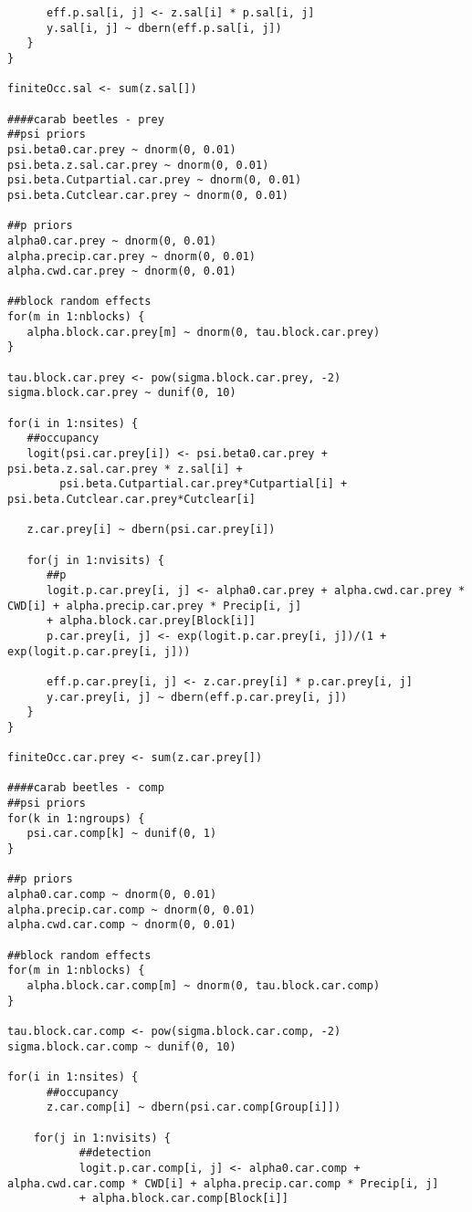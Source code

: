 \begin{lstlisting}
      eff.p.sal[i, j] <- z.sal[i] * p.sal[i, j]
      y.sal[i, j] ~ dbern(eff.p.sal[i, j])
   }
}

finiteOcc.sal <- sum(z.sal[])

####carab beetles - prey
##psi priors
psi.beta0.car.prey ~ dnorm(0, 0.01)
psi.beta.z.sal.car.prey ~ dnorm(0, 0.01)
psi.beta.Cutpartial.car.prey ~ dnorm(0, 0.01)
psi.beta.Cutclear.car.prey ~ dnorm(0, 0.01)

##p priors
alpha0.car.prey ~ dnorm(0, 0.01)
alpha.precip.car.prey ~ dnorm(0, 0.01)
alpha.cwd.car.prey ~ dnorm(0, 0.01)

##block random effects
for(m in 1:nblocks) {
   alpha.block.car.prey[m] ~ dnorm(0, tau.block.car.prey)
}

tau.block.car.prey <- pow(sigma.block.car.prey, -2)
sigma.block.car.prey ~ dunif(0, 10)

for(i in 1:nsites) {
   ##occupancy
   logit(psi.car.prey[i]) <- psi.beta0.car.prey + psi.beta.z.sal.car.prey * z.sal[i] +
    	psi.beta.Cutpartial.car.prey*Cutpartial[i] + psi.beta.Cutclear.car.prey*Cutclear[i]
    	
   z.car.prey[i] ~ dbern(psi.car.prey[i])

   for(j in 1:nvisits) {
      ##p
      logit.p.car.prey[i, j] <- alpha0.car.prey + alpha.cwd.car.prey * CWD[i] + alpha.precip.car.prey * Precip[i, j]
      + alpha.block.car.prey[Block[i]]
      p.car.prey[i, j] <- exp(logit.p.car.prey[i, j])/(1 + exp(logit.p.car.prey[i, j]))

      eff.p.car.prey[i, j] <- z.car.prey[i] * p.car.prey[i, j]
      y.car.prey[i, j] ~ dbern(eff.p.car.prey[i, j])
   }
}

finiteOcc.car.prey <- sum(z.car.prey[])

####carab beetles - comp
##psi priors
for(k in 1:ngroups) {
   psi.car.comp[k] ~ dunif(0, 1)
}

##p priors
alpha0.car.comp ~ dnorm(0, 0.01)
alpha.precip.car.comp ~ dnorm(0, 0.01)
alpha.cwd.car.comp ~ dnorm(0, 0.01)

##block random effects
for(m in 1:nblocks) {
   alpha.block.car.comp[m] ~ dnorm(0, tau.block.car.comp)
}

tau.block.car.comp <- pow(sigma.block.car.comp, -2)
sigma.block.car.comp ~ dunif(0, 10)

for(i in 1:nsites) {
      ##occupancy
      z.car.comp[i] ~ dbern(psi.car.comp[Group[i]])

   	for(j in 1:nvisits) {
      	   ##detection
      	   logit.p.car.comp[i, j] <- alpha0.car.comp + alpha.cwd.car.comp * CWD[i] + alpha.precip.car.comp * Precip[i, j]
           + alpha.block.car.comp[Block[i]]


\end{lstlisting}
